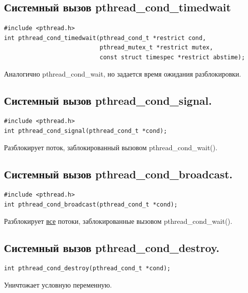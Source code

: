 \documentclass[a4paper]{article}
\begin{document}
\subsection{\Large Системный вызов pthread\_cond\_timedwait}
\begin{verbatim}
#include <pthread.h>
int pthread_cond_timedwait(pthread_cond_t *restrict cond,  
                           pthread_mutex_t *restrict mutex,
                           const struct timespec *restrict abstime);
\end{verbatim}
Аналогично pthread\_cond\_wait, но задается время ожидания разблокировки.

\subsection{\Large Системный вызов pthread\_cond\_signal.}
\begin{verbatim}
#include <pthread.h>
int pthread_cond_signal(pthread_cond_t *cond);
\end{verbatim}
Разблокирует поток, заблокированный вызовом pthread\_cond\_wait().

\subsection{\Large Системный вызов pthread\_cond\_broadcast.}
\begin{verbatim}
#include <pthread.h>
int pthread_cond_broadcast(pthread_cond_t *cond);
\end{verbatim}
Разблокирует \underline{все} потоки, заблокированные вызовом pthread\_cond\_wait().\\

\subsection{\Large Системный вызов pthread\_cond\_destroy.}
\begin{verbatim}
int pthread_cond_destroy(pthread_cond_t *cond);
\end{verbatim}
Уничтожает условную переменную.

\newpage
\end{document}
